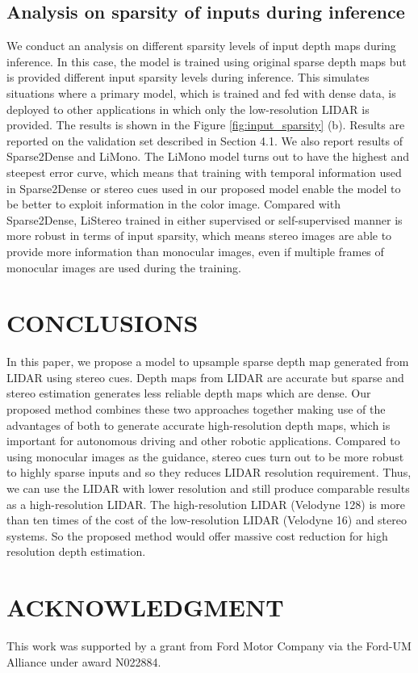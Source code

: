 \documentclass[letterpaper, 10 pt, conference]{ieeeconf}
\begin{document}
    
\subsection{Analysis on sparsity of inputs during inference}
\vspace{-2mm}
    We conduct an analysis on different sparsity levels of input depth maps during inference. In this case, the model is trained using original sparse depth maps but is provided different input sparsity levels during inference. This simulates situations where a primary model, which is trained and fed with dense data, is deployed to other applications in which only the low-resolution LIDAR is provided. The results is shown in the Figure \ref{fig:input_sparsity} (b). Results are reported on the validation set described in Section 4.1. We also report results of Sparse2Dense and LiMono. The LiMono model turns out to have the highest and steepest error curve, which means that training with temporal information used in Sparse2Dense or stereo cues used in our proposed model enable the model to be better to exploit information in the color image. Compared with Sparse2Dense, LiStereo trained in either supervised or self-supervised manner is more robust in terms of input sparsity, which means stereo images are able to provide more information than monocular images, even if multiple frames of monocular images are used during the training.
    

\section{CONCLUSIONS}
In this paper, we propose a model to upsample sparse depth map generated from LIDAR using stereo cues. Depth maps from LIDAR are accurate but sparse and stereo estimation generates less reliable depth maps which are dense. Our proposed method combines these two approaches together making use of the advantages of both to generate accurate high-resolution depth maps, which is important for autonomous driving and other robotic applications. Compared to using monocular images as the guidance, stereo cues turn out to be more robust to highly sparse inputs and so they reduces LIDAR resolution requirement. Thus, we can use the LIDAR with lower resolution and still produce comparable results as a high-resolution LIDAR. The high-resolution LIDAR (Velodyne 128) is more than ten times of the cost of the low-resolution LIDAR (Velodyne 16) and stereo systems. So the proposed method would offer massive cost reduction for high resolution depth estimation. 


\section*{ACKNOWLEDGMENT}
This work was supported by a grant from Ford Motor Company via the Ford-UM Alliance under award N022884.

\printbibliography
\end{document}
